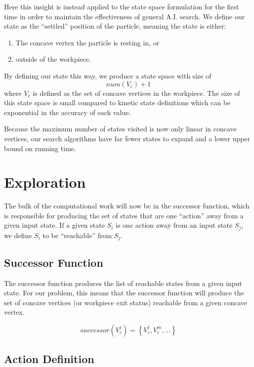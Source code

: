 Here this insight is instead applied to the state space formulation for the first time in order to maintain the effectiveness of general A.I. search. We define our state as the ``settled'' position of the particle, meaning the state is either:

\begin{enumerate}
\item The concave vertex the particle is resting in, or
\item outside of the workpiece.
\end{enumerate}

By defining our state this way, we produce a state space with size of
$$
num(V_{c}) + 1
$$
where $V_{c}$ is defined as the set of concave vertices in the workpiece. The size of this state space is small compared to kinetic state definitions which can be exponential in the accuracy of each value.

Because the maximum number of states visited is now only linear in concave vertices, our search algorithms have far fewer states to expand and a lower upper bound on running time.

\section{Exploration}

The bulk of the computational work will now be in the successor function, which is responsible for producing the set of states that are one ``action'' away from a given input state. If a given state $S_i$ is one action away from an input state $S_j$, we define $S_i$ to be ``reachable'' from $S_j$.

	\subsection{Successor Function}

The successor function produces the list of reachable states from a given input state. For our problem, this means that the successor function will produce the set of concave vertices (or workpiece exit status) reachable from a given concave vertex.

$$
successor(V_{c}^{i}) = \left \{ V_{c}^{l}, V_{c}^{m}, ...  \right \}
$$

	\subsection{Action Definition}

